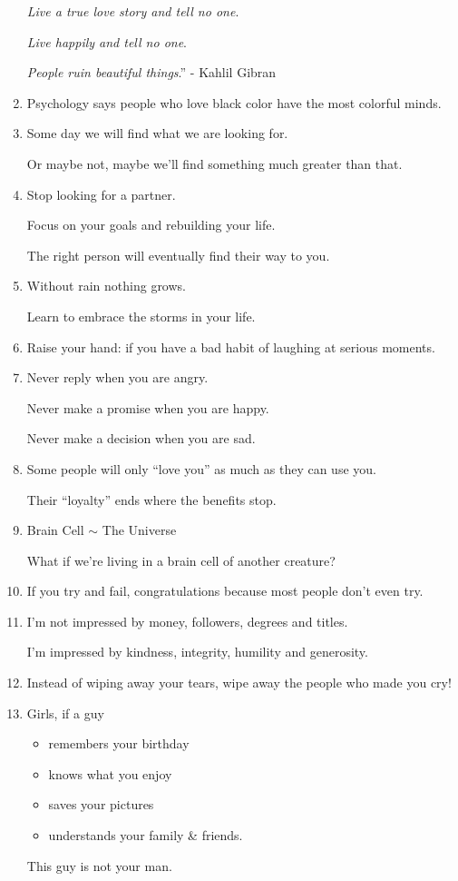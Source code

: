 \documentclass{article}
\begin{document}
\begin{enumerate}
	\textit{Live a true love story and tell no one}.
	
	\textit{Live happily and tell no one}.
	
	\textit{People ruin beautiful things}.'' - Kahlil Gibran
	\item Psychology says people who love black color have the most colorful minds.
	\item Some day we will find what we are looking for.
	
	Or maybe not, maybe we'll find something much greater than that.
	\item Stop looking for a partner.
	
	Focus on your goals and rebuilding your life.
	
	The right person will eventually find their way to you.
	\item Without rain nothing grows.
	
	Learn to embrace the storms in your life.
	\item Raise your hand: if you have a bad habit of laughing at serious moments.
	\item Never reply when you are angry.
	
	Never make a promise when you are happy.
	
	Never make a decision when you are sad.
	\item Some people will only ``love you'' as much as they can use you.
	
	Their ``loyalty'' ends where the benefits stop.
	\item Brain Cell $\sim$ The Universe
	
	What if we're living in a brain cell of another creature?
	\item If you try and fail, congratulations because most people don't even try.
	\item I'm not impressed by money, followers, degrees and titles.
	
	I'm impressed by kindness, integrity, humility and generosity.
	\item Instead of wiping away your tears, wipe away the people who made you cry!
	\item Girls, if a guy
	\begin{itemize}
		\item remembers your birthday
		\item knows what you enjoy
		\item saves your pictures
		\item understands your family \& friends.
	\end{itemize}
	This guy is not your man.
	

\end{enumerate}
\end{document}
